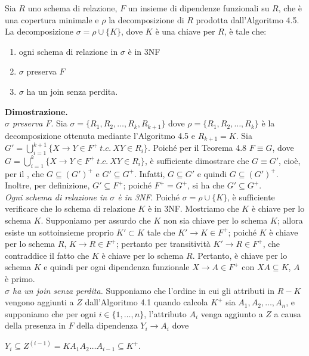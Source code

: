 \begin{theo}
Sia $R$ uno schema di relazione, $F$ un insieme di dipendenze funzionali su $R$, che è una copertura minimale e $\rho$
la decomposizione di $R$ prodotta dall'Algoritmo 4.5. La decomposizione $\sigma = \rho \cup \{K\}$, dove $K$ è una 
chiave per $R$, è tale che:
\begin{enumerate}
 \item ogni schema di relazione in $\sigma$ è in 3NF
 \item $\sigma$ preserva $F$
 \item $\sigma$ ha un join senza perdita. 
\end{enumerate}
\end{theo}
\textbf{Dimostrazione.}\\
\emph{$\sigma$ preserva $F$}. Sia $\sigma =\{R_1, R_2, \ldots, R_k, R_{k+1}\}$ dove $\rho=\{R_1, R_2, \ldots, R_k\}$ 
è la decomposizione ottenuta mediante l'Algoritmo 4.5 e $R_{k+1} = K$. Sia $G'= \bigcup_{i=1}^{k+1}\{X\rightarrow Y 
\in F^+\ t.c.\ XY \in R_i\}$. Poiché per il Teorema 4.8 $F\equiv G$, dove $G = \bigcup_{i=1}^k \{X\rightarrow Y\in F^+
\ t.c.\ XY\in R_i\}$, è sufficiente dimostrare che $G\equiv G'$, cioè, per il , che 
$G\subseteq (G')^+$ e $G'\subseteq G^+$. Infatti, $G\subseteq G'$ e quindi $G\subseteq (G')^+$. Inoltre, per 
definizione, $G' \subseteq F^+$; poiché $F^+ =G^+$, si ha che $G'\subseteq G^+$.\\
\emph{Ogni schema di relazione in $\sigma$ è in 3NF}. Poiché $\sigma =\rho \cup \{K\}$, è sufficiente verificare che 
lo schema di relazione $K$ è in 3NF. Mostriamo che $K$ è chiave per lo schema $K$. Supponiamo per assurdo che
$K$ non sia chiave per lo schema $K$; allora esiste un sottoinsieme proprio $K' \subset K$ tale che $K'\rightarrow 
K \in F^+$; poiché $K$ è chiave per lo schema $R$, $K\rightarrow R \in F^+$; pertanto per transitività $K'\rightarrow
R \in F^+$, che contraddice il fatto che $K$ è chiave per lo schema $R$. Pertanto, è chiave per lo schema $K$ e quindi per
ogni dipendenza funzionale $X \rightarrow A \in F^+$ con $XA \subseteq K$, $A$ è primo.\\
\emph{$\sigma$ ha un join senza perdita.} Supponiamo che l'ordine in cui gli attributi in $R-K$ vengono aggiunti a
$Z$ dall'Algoritmo 4.1 quando calcola $K^+$ sia $A_1, A_2, \ldots, A_n$, e supponiamo che per ogni $i \in 
\{1, \ldots, n\}$, l'attributo $A_i$ venga aggiunto a $Z$ a causa della presenza in $F$ della dipendenza $Y_i 
\rightarrow A_i$ dove 
\begin{center}
$Y_i \subseteq Z^{(i-1)} = KA_1A_2\ldots A_{i-1} \subseteq K^+$. 
\end{center}

